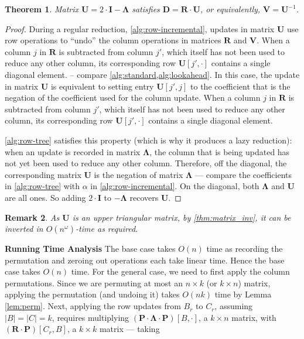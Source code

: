 \documentclass{article}
\newtheorem{theorem}{Theorem}[section]
\newtheorem{remark}[theorem]{Remark}
\newcommand{\matsize}[2]{#1\times #2}
\newcommand{\matexp}{\omega}
\newcommand{\mat}[1]{\mathbf{#1}}
\begin{document}
\begin{theorem}
    Matrix $\mat{U} = 2\cdot \mat{I} - \mat{\Lambda}$ satisfies $\mat{D} = \mat{R} \cdot \mat{U}$, or equivalently, $\mat{V} = \mat{U}^{-1}$.
\end{theorem}
\begin{proof}
    During a regular reduction, \cref{alg:row-incremental}, updates in matrix $\mat{U}$ use row operations to ``undo'' the column operations in matrices $\mat{R}$ and $\mat{V}$. When a column $j$ in $\mat{R}$ is subtracted from column $j'$, which itself has not been used to reduce any other column, its corresponding row $\mat{U}[j',\cdot]$ contains a single diagonal element.
     -- compare \cref{alg:standard,alg:lookahead}.
    In this case, the update in matrix $\mat{U}$ is equivalent to setting entry $\mat{U}[j',j]$ to the coefficient that is the negation of the coefficient used for the column update.
%
%
 When a column $j$ in $\mat{R}$ is subtracted from column $j'$, which itself has not been used to reduce any other column, its corresponding row $\mat{U}[j',\cdot]$ contains a single diagonal element.

    \cref{alg:row-tree} satisfies this property (which is why it produces a lazy reduction): when an update is recorded in matrix $\mat{\Lambda}$, the column that is being updated has not yet been used to reduce any other column. Therefore, off the diagonal,  the corresponding matrix $\mat{U}$ is the negation of matrix $\mat{\Lambda}$ --- compare the coefficients in  \cref{alg:row-tree} with $\alpha$ in  \cref{alg:row-incremental}. On the diagonal, both $\mat{\Lambda}$ and $\mat{U}$ are all ones.
    So adding $2 \cdot \mat{I}$ to $-\mat{\Lambda}$ recovers $\mat{U}$.
\end{proof}
\begin{remark}
As $\mat{U}$ is an upper triangular matrix, by \cref{thm:matrix_inv}, it can be inverted in $O(n^{\matexp})$-time as required. 
\end{remark}
\noindent\textbf{Running Time Analysis}
The base case takes $O(n)$ time as recording the permutation and zeroing out operations each take linear time. Hence the base case takes $O(n)$ time. 
%
For the general case, we need to first apply the column permutations. Since we are permuting at most an $\matsize{n}{k}$ (or $\matsize{k}{n}$) matrix, applying the permutation (and undoing it) takes $O(nk)$ time by Lemma \ref{lem:perm}. 
Next, applying the row updates from $B_r$ to $C_r$, assuming $|B|=|C| = k$, requires multiplying $(\mat{P} \cdot \mat{\Lambda} \cdot \mat{P})[B,\cdot]$, a $\matsize{k}{n}$ matrix, with $(\mat{R}\cdot\mat{P})[C_r,B]$, a $\matsize{k}{k}$ matrix --- taking
\end{document}
